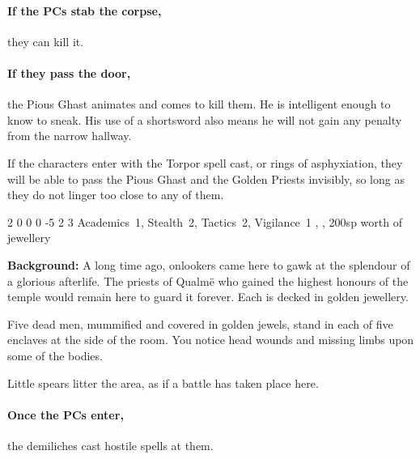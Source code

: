 \begin{multicols}{2}
\begin{boxtext}
\end{boxtext}

\paragraph{If the PCs stab the corpse,}
they can kill it.

\paragraph{If they pass the door,}
the Pious Ghast animates and comes to kill them.
He is intelligent enough to know to sneak.
His use of a shortsword also means he will not gain any penalty from the narrow hallway.

If the characters enter with the Torpor spell cast, or rings of asphyxiation, they will be able to pass the Pious Ghast and the Golden Priests invisibly, so long as they do not linger too close to any of them.


  {2}%
  {0}%
  {{0}%
  {0}%
  {-5}}%
  {2}%
  {3}%
  {Academics~1, Stealth~2, Tactics~2, Vigilance~1}%
  {\shortsword, \completeplate, 200sp worth of jewellery}%
  {}


\textbf{Background:}
A long time ago, onlookers came here to gawk at the splendour of a glorious afterlife.
The priests of Qualm\"{e} who gained the highest honours of the temple would remain here to guard it forever.
Each is decked in golden jewellery.

\begin{boxtext}

  Five dead men, mummified and covered in golden jewels, stand in each of five enclaves at the side of the room.
  You notice head wounds and missing limbs upon some of the bodies.

  Little spears litter the area, as if a battle has taken place here.

\end{boxtext}



\paragraph{Once the PCs enter,}
the demiliches cast hostile spells at them.


\end{multicols}
